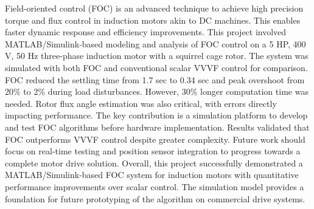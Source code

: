 
\setcounter{page}{1}


\hspace{0.2in}Field-oriented control (FOC) is an advanced technique to achieve high precision torque and flux control in induction motors akin to DC machines. This enables faster dynamic response and efficiency improvements. This project involved MATLAB/Simulink-based modeling and analysis of FOC control on a 5 HP, 400 V, 50 Hz three-phase induction motor with a squirrel cage rotor. The system was simulated with both FOC and conventional scalar VVVF control for comparison. FOC reduced the settling time from 1.7 sec to 0.34 sec and peak overshoot from 20\% to 2\% during load disturbances. However, 30\% longer computation time was needed. Rotor flux angle estimation was also critical, with errors directly impacting performance. The key contribution is a simulation platform to develop and test FOC algorithms before hardware implementation. Results validated that FOC outperforms VVVF control despite greater complexity. Future work should focus on real-time testing and position sensor integration to progress towards a complete motor drive solution. Overall, this project successfully demonstrated a MATLAB/Simulink-based FOC system for induction motors with quantitative performance improvements over scalar control. The simulation model provides a foundation for future prototyping of the algorithm on commercial drive systems.


\newpage